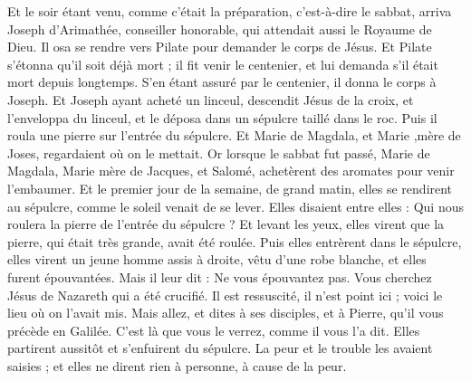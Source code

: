 \begin{multicols}{2}
Et le soir étant venu, comme c'était la préparation, c’est-à-dire le sabbat,
arriva Joseph d'Arimathée, conseiller honorable, qui attendait aussi le Royaume de Dieu. Il osa se rendre vers Pilate pour demander le corps de Jésus.
Et Pilate s'étonna qu'il soit déjà mort ; il fit venir le centenier, et lui demanda s'il était mort depuis longtemps.
S’en étant assuré par le centenier, il donna le corps à Joseph.
Et Joseph ayant acheté un linceul, descendit Jésus de la croix, et l'enveloppa du linceul, et le déposa dans un sépulcre taillé dans le roc. Puis il roula une pierre sur l'entrée du sépulcre.
Et Marie de Magdala, et Marie ,mère de Joses, regardaient où on le mettait.
\VerseOne{}Or lorsque le sabbat fut passé, Marie de Magdala, Marie mère de Jacques, et Salomé, achetèrent des aromates pour venir l'embaumer.
Et le premier jour de la semaine, de grand matin, elles se rendirent au sépulcre, comme le soleil venait de se lever.
Elles disaient entre elles : Qui nous roulera la pierre de l'entrée du sépulcre ?
Et levant les yeux, elles virent que la pierre, qui était très grande, avait été roulée.
Puis elles entrèrent dans le sépulcre, elles virent un jeune homme assis à droite, vêtu d'une robe blanche, et elles furent épouvantées.
Mais il leur dit : Ne vous épouvantez pas. Vous cherchez Jésus de Nazareth qui a été crucifié. Il est ressuscité, il n'est point ici ; voici le lieu où on l'avait mis.
Mais allez, et dites à ses disciples, et à Pierre, qu'il vous précède en Galilée. C’est là que vous le verrez, comme il vous l'a dit.
Elles partirent aussitôt et s'enfuirent du sépulcre. La peur et le trouble les avaient saisies ; et elles ne dirent rien à personne, à cause de la peur.

\end{multicols}
